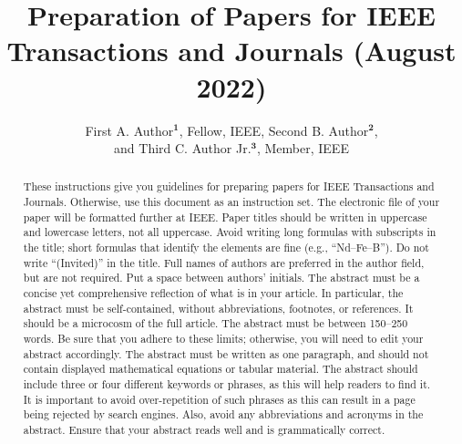 \documentclass{ieeetj}
\def\authorrefmark#1{\ensuremath{^{\textbf{#1}}}}
\begin{document}


\title{Preparation of Papers for IEEE Transactions and Journals (August 2022)}

\author{First A. Author\authorrefmark{1}, Fellow, IEEE, Second B. Author\authorrefmark{2},\\ and Third C. Author Jr.\authorrefmark{3}, Member, IEEE}


\begin{abstract}
These instructions give you guidelines for preparing papers for IEEE Transactions and Journals.
Otherwise, use this document as an instruction set. The electronic file of your paper will be formatted further at IEEE. Paper titles should be written in uppercase and lowercase letters, not all uppercase. Avoid writing long formulas with subscripts in the title; short formulas that identify the elements are fine (e.g., ``Nd--Fe--B''). Do not write ``(Invited)'' in the title. Full names of authors are preferred in the author field, but are not required. Put a space between authors' initials. The abstract must be a concise yet comprehensive reflection of what is in your article. In particular, the abstract must be self-contained, without abbreviations, footnotes, or references. It should be a microcosm of the full article. The abstract must be between 150--250 words. Be sure that you adhere to these limits; otherwise, you will need to edit your abstract accordingly. The abstract must be written as one paragraph, and should not contain displayed mathematical equations or tabular material. The abstract should include three or four different keywords or phrases, as this will help readers to find it. It is important to avoid over-repetition of such phrases as this can result in a page being rejected by search engines. Also, avoid any abbreviations and acronyms in the abstract. Ensure that your abstract reads well and is grammatically correct.
\end{abstract}
\end{document}
